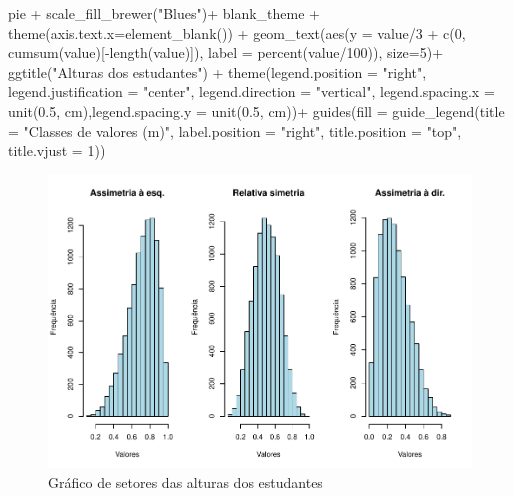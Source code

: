 \documentclass[
]{book}
\newenvironment{Shaded}{\begin{snugshade}}{\end{snugshade}}
\newcommand{\AttributeTok}[1]{\textcolor[rgb]{0.77,0.63,0.00}{#1}}
\newcommand{\DecValTok}[1]{\textcolor[rgb]{0.00,0.00,0.81}{#1}}
\newcommand{\FloatTok}[1]{\textcolor[rgb]{0.00,0.00,0.81}{#1}}
\newcommand{\FunctionTok}[1]{\textcolor[rgb]{0.00,0.00,0.00}{#1}}
\newcommand{\NormalTok}[1]{#1}
\newcommand{\SpecialCharTok}[1]{\textcolor[rgb]{0.00,0.00,0.00}{#1}}
\newcommand{\StringTok}[1]{\textcolor[rgb]{0.31,0.60,0.02}{#1}}
\begin{document}
\begin{Shaded}
\begin{Highlighting}[]
\NormalTok{pie }\SpecialCharTok{+} 
  \FunctionTok{scale\_fill\_brewer}\NormalTok{(}\StringTok{"Blues"}\NormalTok{)}\SpecialCharTok{+}
\NormalTok{  blank\_theme }\SpecialCharTok{+}
  \FunctionTok{theme}\NormalTok{(}\AttributeTok{axis.text.x=}\FunctionTok{element\_blank}\NormalTok{()) }\SpecialCharTok{+}
  \FunctionTok{geom\_text}\NormalTok{(}\FunctionTok{aes}\NormalTok{(}\AttributeTok{y =}\NormalTok{ value}\SpecialCharTok{/}\DecValTok{3} \SpecialCharTok{+} \FunctionTok{c}\NormalTok{(}\DecValTok{0}\NormalTok{, }\FunctionTok{cumsum}\NormalTok{(value)[}\SpecialCharTok{{-}}\FunctionTok{length}\NormalTok{(value)]), }
                \AttributeTok{label =} \FunctionTok{percent}\NormalTok{(value}\SpecialCharTok{/}\DecValTok{100}\NormalTok{)), }\AttributeTok{size=}\DecValTok{5}\NormalTok{)}\SpecialCharTok{+}
  \FunctionTok{ggtitle}\NormalTok{(}\StringTok{"Alturas dos estudantes"}\NormalTok{) }\SpecialCharTok{+}
  \FunctionTok{theme}\NormalTok{(}\AttributeTok{legend.position =} \StringTok{"right"}\NormalTok{, }\AttributeTok{legend.justification =} \StringTok{"center"}\NormalTok{, }\AttributeTok{legend.direction =} \StringTok{"vertical"}\NormalTok{,}
        \AttributeTok{legend.spacing.x =} \FunctionTok{unit}\NormalTok{(}\FloatTok{0.5}\NormalTok{, }\StringTok{\textquotesingle{}cm\textquotesingle{}}\NormalTok{),}\AttributeTok{legend.spacing.y =} \FunctionTok{unit}\NormalTok{(}\FloatTok{0.5}\NormalTok{, }\StringTok{\textquotesingle{}cm\textquotesingle{}}\NormalTok{))}\SpecialCharTok{+}
  \FunctionTok{guides}\NormalTok{(}\AttributeTok{fill =} \FunctionTok{guide\_legend}\NormalTok{(}\AttributeTok{title =} \StringTok{"Classes de valores (m)"}\NormalTok{,}
                             \AttributeTok{label.position =} \StringTok{"right"}\NormalTok{,}
                             \AttributeTok{title.position =} \StringTok{"top"}\NormalTok{, }\AttributeTok{title.vjust =} \DecValTok{1}\NormalTok{)) }
\end{Highlighting}
\end{Shaded}

\begin{figure}
\centering
\includegraphics{apostila_files/figure-latex/unnamed-chunk-41-1.pdf}
\caption{\label{fig:unnamed-chunk-41}Gráfico de setores das alturas dos estudantes}
\end{figure}
\end{document}
